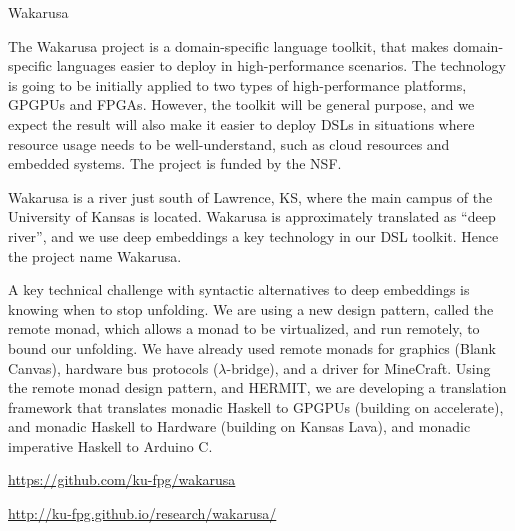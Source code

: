 \begin{hcarentry}[new]{Wakarusa}
\label{Wakarusa}
\makeheader

The Wakarusa project is a domain-specific language toolkit,
that makes domain-specific languages easier to deploy in
high-performance scenarios. The technology is going to be initially
applied to two types of high-performance platforms, GPGPUs and
FPGAs. However, the toolkit will be general purpose, and we expect the
result will also make it easier to deploy DSLs in situations where
resource usage needs to be well-understand, such as cloud resources
and embedded systems. The project is funded by the NSF.

Wakarusa is a river just south of Lawrence, KS, where the main campus
of the University of Kansas is located. Wakarusa is approximately
translated as ``deep river'', and we use deep embeddings a key
technology in our DSL toolkit. Hence the project name Wakarusa.

A key technical challenge with syntactic alternatives to deep embeddings
is knowing when to stop unfolding. We are using a new design pattern,
called the remote monad, which allows a monad to be virtualized, and
run remotely, to bound our unfolding.
%
We have already used remote monads for graphics (Blank Canvas),
hardware bus protocols ($\lambda$-bridge), and a driver for MineCraft.
Using the remote monad design pattern, and HERMIT, we are developing
a translation framework that translates monadic Haskell to GPGPUs (building on
accelerate), and monadic Haskell to Hardware (building on Kansas Lava),
and monadic imperative Haskell to Arduino C.

\FurtherReading
\begin{compactitem}
\item
  \url{https://github.com/ku-fpg/wakarusa}
\item
  \url{http://ku-fpg.github.io/research/wakarusa/}
\end{compactitem}
\end{hcarentry}
